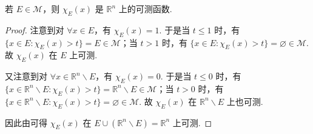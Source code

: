 \documentclass[../../main.tex]{subfiles}
\begin{document}
\begin{proposition}
若 \(E \in \mathscr{M}\)，则 \(\chi_E(x)\) 是 \(\mathbb{R}^n\) 上的可测函数. 
\end{proposition}
\begin{proof}
注意到对 \(\forall x \in E\)，有 \(\chi_E(x) = 1\). 于是当 \(t \leqslant 1\) 时，有 \(\{x \in E: \chi_E(x) > t\} = E \in \mathscr{M}\)；当 \(t > 1\) 时，有 \(\{x \in E: \chi_E(x) > t\} = \varnothing \in \mathscr{M}\). 故 \(\chi_E(x)\) 在 \(E\) 上可测.

又注意到对 \(\forall x \in \mathbb{R}^n \backslash E\)，有 \(\chi_E(x) = 0\). 于是当 \(t \leqslant 0\) 时，有 \(\{x \in \mathbb{R}^n \backslash E: \chi_E(x) > t\} = \mathbb{R}^n \backslash E \in \mathscr{M}\)；当 \(t > 0\) 时，有 \(\{x \in \mathbb{R}^n \backslash E: \chi_E(x) > t\} = \varnothing \in \mathscr{M}\). 故 \(\chi_E(x)\) 在 \(\mathbb{R}^n \backslash E\) 上也可测.

因此由可得 \(\chi_E(x)\) 在 \(E \cup (\mathbb{R}^n \backslash E) = \mathbb{R}^n\) 上可测.
\end{proof}
\end{document}
